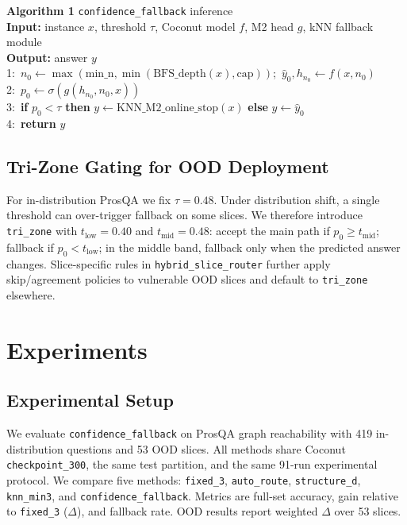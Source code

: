 \documentclass{article}
\begin{document}
\noindent\textbf{Algorithm 1} \texttt{confidence\_fallback} inference\\
\textbf{Input:} instance $x$, threshold $\tau$, Coconut model $f$, M2 head $g$, kNN fallback module\\
\textbf{Output:} answer $y$\\
1:\ $n_0\leftarrow\max(\mathrm{min\_n},\min(\mathrm{BFS\_depth}(x),\mathrm{cap}))$;\ $\hat y_0, h_{n_0}\leftarrow f(x,n_0)$\\
2:\ $p_0\leftarrow\sigma(g(h_{n_0},n_0,x))$\\
3:\ \textbf{if} $p_0<\tau$ \textbf{then} $y\leftarrow\mathrm{KNN\_M2\_online\_stop}(x)$ \textbf{else} $y\leftarrow\hat y_0$\\
4:\ \textbf{return} $y$

\subsection{Tri-Zone Gating for OOD Deployment}

For in-distribution ProsQA we fix $\tau=0.48$. Under distribution shift, a single threshold can over-trigger fallback on some slices. We therefore introduce \texttt{tri\_zone} with $t_{\mathrm{low}}=0.40$ and $t_{\mathrm{mid}}=0.48$: accept the main path if $p_0\ge t_{\mathrm{mid}}$; fallback if $p_0<t_{\mathrm{low}}$; in the middle band, fallback only when the predicted answer changes. Slice-specific rules in \texttt{hybrid\_slice\_router} further apply skip/agreement policies to vulnerable OOD slices and default to \texttt{tri\_zone} elsewhere.

\section{Experiments}

\subsection{Experimental Setup}

We evaluate \texttt{confidence\_fallback} on ProsQA graph reachability with 419 in-distribution questions and 53 OOD slices. All methods share Coconut \texttt{checkpoint\_300}, the same test partition, and the same 91-run experimental protocol. We compare five methods: \texttt{fixed\_3}, \texttt{auto\_route}, \texttt{structure\_d}, \texttt{knn\_min3}, and \texttt{confidence\_fallback}. Metrics are full-set accuracy, gain relative to \texttt{fixed\_3} ($\Delta$), and fallback rate. OOD results report weighted $\Delta$ over 53 slices.
\end{document}
